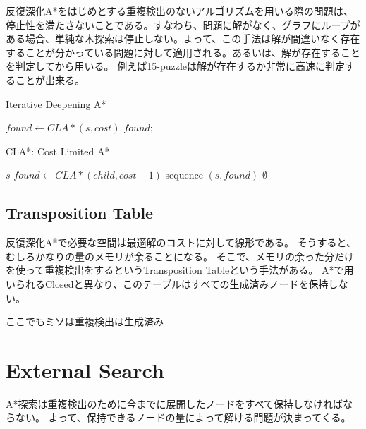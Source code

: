 \documentclass{book}
\begin{document}
反復深化A*をはじめとする重複検出のないアルゴリズムを用いる際の問題は、停止性を満たさないことである。すなわち、問題に解がなく、グラフにループがある場合、単純な木探索は停止しない。よって、この手法は解が間違いなく存在することが分かっている問題に対して適用される。あるいは、解が存在することを判定してから用いる。
例えば15-puzzleは解が存在するか非常に高速に判定することが出来る。



\begin{algorithm}
\caption{Iterative Deepening A*}
\label{alg:iterative-deepening-astar}
	 {
		$found \leftarrow CLA*(s, cost)$\;
		 {
			\Return $found$;
		}
	}
\end{algorithm}

\begin{algorithm}
\caption{CLA*: Cost Limited A*}
\label{alg:implicit-graph-search}
	 {
		\Return $s$\;
	}
	 {
		$found \leftarrow CLA*(child, cost - 1)$\;
		 {
			\Return sequence $(s, found)$\;
		}
	}
	\Return $\emptyset$\;
\end{algorithm}

\subsection{Transposition Table}

反復深化A*で必要な空間は最適解のコストに対して線形である。
そうすると、むしろかなりの量のメモリが余ることになる。
そこで、メモリの余った分だけを使って重複検出をするというTransposition Tableという手法がある。
A*で用いられるClosedと異なり、このテーブルはすべての生成済みノードを保持しない。

ここでもミソは重複検出は生成済み

\section{External Search}

A*探索は重複検出のために今までに展開したノードをすべて保持しなければならない。
よって、保持できるノードの量によって解ける問題が決まってくる。
\end{document}
